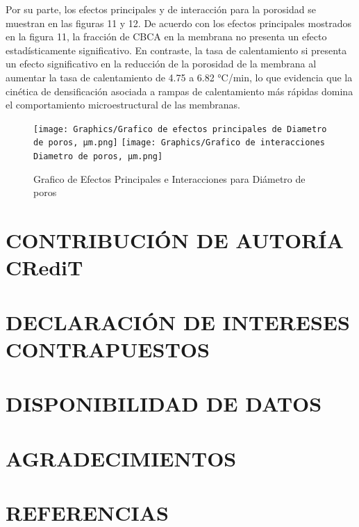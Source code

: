 \documentclass{article}
\begin{document}
Por su parte, los efectos principales y de interacción para la porosidad 
se muestran en las figuras 11 y 12. 
De acuerdo con los efectos principales mostrados en la figura 11, 
la fracción de CBCA en la membrana no presenta un efecto 
estadísticamente significativo. 
En contraste, la tasa de calentamiento si presenta un efecto 
significativo en la reducción de la porosidad de la membrana al 
aumentar la tasa de calentamiento de 4.75 a 6.82 °C/min, lo que 
evidencia que la cinética de densificación asociada a rampas de 
calentamiento más rápidas domina el comportamiento microestructural 
de las membranas. 

\begin{figure}
    \centering
    \texttt{[image: Graphics/Grafico de efectos principales de Diametro de poros, μm.png]}
    \texttt{[image: Graphics/Grafico de interacciones Diametro de poros, μm.png]}
    \caption{Grafico de Efectos Principales e Interacciones para Diámetro de poros}
    \label{fig:EfectosPrinDiametroPoros}
\end{figure}

\newpage
\section{CONTRIBUCIÓN DE AUTORÍA CRediT}

\section{DECLARACIÓN DE INTERESES CONTRAPUESTOS}

\section{DISPONIBILIDAD DE DATOS}

\section{AGRADECIMIENTOS}

\section{REFERENCIAS}

\printbibliography
\end{document}

